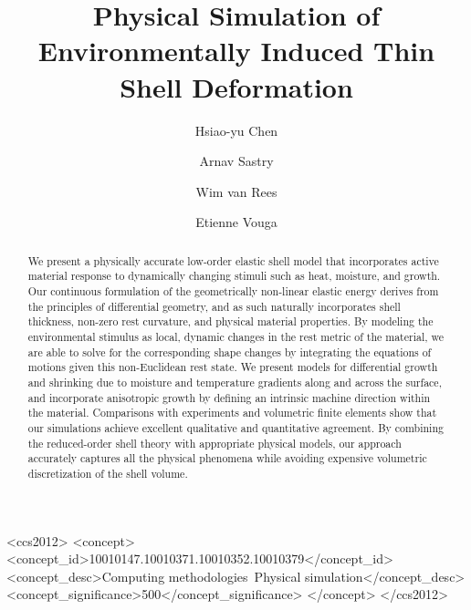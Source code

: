 \documentclass[timestamp,acmtog]{acmart}
\begin{document}
\title{Physical Simulation of Environmentally Induced Thin Shell Deformation}

\author{Hsiao-yu Chen}

  \author{Arnav Sastry}
  
  \author{Wim van Rees}

\author{Etienne Vouga}


\begin{abstract}
We present a physically accurate low-order elastic shell model that incorporates active material response to dynamically changing stimuli such as heat, moisture, and growth. Our continuous formulation of the geometrically non-linear elastic energy derives from the principles of differential geometry, and as such naturally incorporates shell thickness, non-zero rest curvature, and physical material properties. By modeling the environmental stimulus as local, dynamic changes in the rest metric of the material, we are able to solve for the corresponding shape changes by integrating the equations of motions given this non-Euclidean rest state. We present models for differential growth and shrinking due to moisture and temperature gradients along and across the surface, and incorporate anisotropic growth by defining an intrinsic machine direction within the material. Comparisons with experiments and volumetric finite elements show that our simulations achieve excellent qualitative and quantitative agreement. By combining the reduced-order shell theory with appropriate physical models, our approach accurately captures all the physical phenomena while avoiding expensive volumetric discretization of the shell volume. 
\end{abstract}


\begin{CCSXML}
<ccs2012>
<concept>
<concept_id>10010147.10010371.10010352.10010379</concept_id>
<concept_desc>Computing methodologies~Physical simulation</concept_desc>
<concept_significance>500</concept_significance>
</concept>
</ccs2012>
\end{CCSXML}
\end{document}
